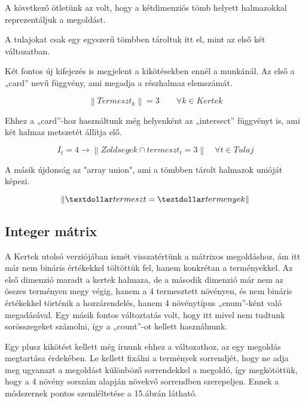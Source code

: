 \documentclass[12pt,a4paper,twoside, openright]{report}
\begin{document}
    A következő ötletünk az volt, hogy a kétdimenziós tömb helyett halmazokkal reprezentáljuk a megoldást.


    A tulajokat csak egy egyszerű tömbben tároltuk itt el, mint az első két változatban.

    Két fontos új kifejezés is megjelent a kikötésekben ennél a munkánál.
    Az első a „card” nevű függvény, ami megadja a részhalmaz elemszámát.

    \begin{equation}
    \left\| Termeszt_k \right\| =3 \qquad \forall k \in Kertek
    \end{equation}

    Ehhez a „card”-hoz használtunk még helyenként az „intersect” függvényt is, ami két halmaz metszetét állítja elő.

    \begin{equation}
    I_t=4 \rightarrow \left\| Zoldsegek \cap termeszt_t =3 \right\| \quad \forall t \in Tulaj
    \end{equation}

    A másik újdonság az "array union", ami a tömbben tárolt halmazok unióját képezi.
    
    \begin{equation}
     \left\| \textdollar termeszt= \textdollar termenyek \right\| 
    \end{equation}

\subsection{Integer mátrix}

    A Kertek utolsó verziójában ismét visszatértünk a mátrixos megoldáshoz, ám itt már nem bináris értékekkel töltöttük fel, hanem konkrétan a terményekkel.
    Az első dimenzió maradt a kertek halmaza, de a második dimenzió már nem az összes terményen megy végig, hanem a 4 termesztett növényen, és nem bináris értékekkel történik a hozzárendelés, hanem 4 növénytípus „enum”-ként való megadásával.
    Egy másik fontos változtatás volt, hogy itt mivel nem tudtunk sorösszegeket számolni, így a „count”-ot kellett használnunk.



    Egy plusz kikötést kellett még írnunk ehhez a változathoz, az egy megoldás megtartása érdekében.
    Le kellett fixálni a termények sorrendjét, hogy ne adja meg ugyanazt a megoldást különböző sorrendekkel a megoldó, így megkötöttük, hogy a 4 növény sorszám alapján növekvő sorrendben szerepeljen.
    Ennek a módszernek pontos szemléltetése a 15.ábrán látható.
\end{document}
